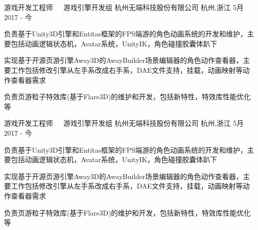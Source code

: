 


\begin{cventries}


\cventry
{游戏开发工程师~~~游戏引擎开发组} %
{杭州无端科技股份有限公司} %
{杭州,浙江} %
{5月~ 2017 - 今} %
{ %
\begin{cvitems}
\item {负责基于Unity3D引擎和Entitas框架的FPS端游的角色动画系统的开发和维护，主要包括动画逻辑状态机，Avatar系统，UnityIK，角色碰撞胶囊体趴下}
\item {实现基于开源页游引擎Away3D的AwayBuilder场景编辑器的角色动作查看器，主要工作包括修改引擎从左手系改成右手系，DAE文件支持，挂载，动画映射等动作查看器需求}
\item {负责页游粒子特效库(基于Flare3D)的维护和开发，包括新特性，特效库性能优化等}
\end{cvitems}
}


\cventrynewaa
{游戏开发工程师~~~游戏引擎开发组} %
{杭州无端科技股份有限公司} %
{杭州,浙江} %
{5月~ 2017 - 今} %
{ %
	\begin{cvitems}
		\item {负责基于Unity3D引擎和Entitas框架的FPS端游的角色动画系统的开发和维护，主要包括动画逻辑状态机，Avatar系统，UnityIK，角色碰撞胶囊体趴下}
		\item {实现基于开源页游引擎Away3D的AwayBuilder场景编辑器的角色动作查看器，主要工作包括修改引擎从左手系改成右手系，DAE文件支持，挂载，动画映射等动作查看器需求}
		\item {负责页游粒子特效库(基于Flare3D)的维护和开发，包括新特性，特效库性能优化等}
	\end{cvitems}
}



\end{cventries}

